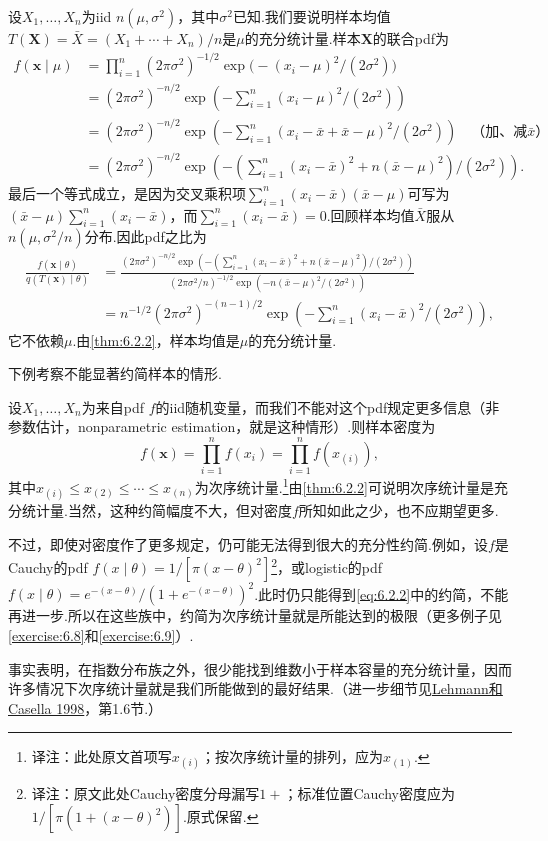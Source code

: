 \begin{example}[正态分布的充分统计量]\label{ex:6.2.4}
设$X_1,\ldots,X_n$为iid $n(\mu,\sigma^2)$，其中$\sigma^2$已知.我们要说明样本均值$T(\boldsymbol X)=\bar X=(X_1+\cdots+X_n)/n$是$\mu$的充分统计量.样本$\boldsymbol X$的联合pdf为
\begin{equation}\label{eq:6.2.1}
\begin{aligned}
f(\boldsymbol x\mid\mu)&=\prod_{i=1}^n(2\pi\sigma^2)^{-1/2}\exp\bigl(-(x_i-\mu)^2/(2\sigma^2)\bigr)\\
&=(2\pi\sigma^2)^{-n/2}\exp\left(-\sum_{i=1}^n(x_i-\mu)^2/(2\sigma^2)\right)\\
&=(2\pi\sigma^2)^{-n/2}\exp\left(-\sum_{i=1}^n(x_i-\bar x+\bar x-\mu)^2/(2\sigma^2)\right)\quad\text{（加、减$\bar x$）}\\
&=(2\pi\sigma^2)^{-n/2}\exp\left(-\left(\sum_{i=1}^n(x_i-\bar x)^2+n(\bar x-\mu)^2\right)/(2\sigma^2)\right).
\end{aligned}
\end{equation}
最后一个等式成立，是因为交叉乘积项$\sum_{i=1}^n(x_i-\bar x)(\bar x-\mu)$可写为$(\bar x-\mu)\sum_{i=1}^n(x_i-\bar x)$，而$\sum_{i=1}^n(x_i-\bar x)=0$.回顾样本均值$\bar X$服从$n(\mu,\sigma^2/n)$分布.因此pdf之比为
\begin{align*}
\frac{f(\boldsymbol x\mid\theta)}{q(T(\boldsymbol x)\mid\theta)}
&=\frac{(2\pi\sigma^2)^{-n/2}\exp\left(-\left(\sum_{i=1}^n(x_i-\bar x)^2+n(\bar x-\mu)^2\right)/(2\sigma^2)\right)}{(2\pi\sigma^2/n)^{-1/2}\exp(-n(\bar x-\mu)^2/(2\sigma^2))}\\
&=n^{-1/2}(2\pi\sigma^2)^{-(n-1)/2}\exp\left(-\sum_{i=1}^n(x_i-\bar x)^2/(2\sigma^2)\right),
\end{align*}
它不依赖$\mu$.由\autoref{thm:6.2.2}，样本均值是$\mu$的充分统计量.
\end{example}
下例考察不能显著约简样本的情形.
\begin{example}[充分的次序统计量]\label{ex:6.2.5}
设$X_1,\ldots,X_n$为来自pdf $f$的iid随机变量，而我们不能对这个pdf规定更多信息（非参数估计，nonparametric estimation，就是这种情形）.则样本密度为
\begin{equation}\label{eq:6.2.2}
f(\boldsymbol x)=\prod_{i=1}^nf(x_i)=\prod_{i=1}^nf(x_{(i)}),
\end{equation}
其中$x_{(i)}\le x_{(2)}\le\cdots\le x_{(n)}$为次序统计量.\footnote{译注：此处原文首项写$x_{(i)}$；按次序统计量的排列，应为$x_{(1)}$.}由\autoref{thm:6.2.2}可说明次序统计量是充分统计量.当然，这种约简幅度不大，但对密度$f$所知如此之少，也不应期望更多.

不过，即使对密度作了更多规定，仍可能无法得到很大的充分性约简.例如，设$f$是Cauchy的pdf $f(x\mid\theta)=1/[\pi(x-\theta)^2]$\footnote{译注：原文此处Cauchy密度分母漏写$1+$；标准位置Cauchy密度应为$1/[\pi(1+(x-\theta)^2)]$.原式保留.}，或logistic的pdf $f(x\mid\theta)=e^{-(x-\theta)}/(1+e^{-(x-\theta)})^2$.此时仍只能得到\eqref{eq:6.2.2}中的约简，不能再进一步.所以在这些族中，约简为次序统计量就是所能达到的极限（更多例子见\autoref{exercise:6.8}和\autoref{exercise:6.9}）.

事实表明，在指数分布族之外，很少能找到维数小于样本容量的充分统计量，因而许多情况下次序统计量就是我们所能做到的最好结果.（进一步细节见\hyperref[bib:source200]{Lehmann和Casella 1998}，第1.6节.）
\end{example}
